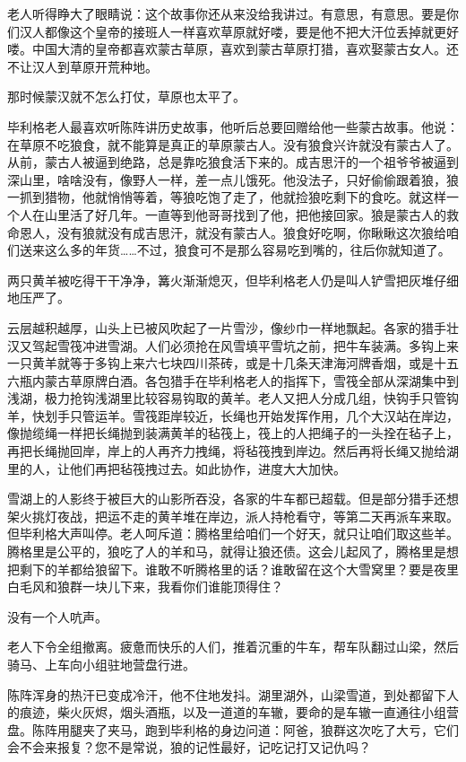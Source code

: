 \par 老人听得睁大了眼睛说：这个故事你还从来没给我讲过。有意思，有意思。要是你们汉人都像这个皇帝的接班人一样喜欢草原就好喽，要是他不把大汗位丢掉就更好喽。中国大清的皇帝都喜欢蒙古草原，喜欢到蒙古草原打猎，喜欢娶蒙古女人。还不让汉人到草原开荒种地。
\par 那时候蒙汉就不怎么打仗，草原也太平了。
\par 毕利格老人最喜欢听陈阵讲历史故事，他听后总要回赠给他一些蒙古故事。他说：在草原不吃狼食，就不能算是真正的草原蒙古人。没有狼食兴许就没有蒙古人了。从前，蒙古人被逼到绝路，总是靠吃狼食活下来的。成吉思汗的一个祖爷爷被逼到深山里，啥啥没有，像野人一样，差一点儿饿死。他没法子，只好偷偷跟着狼，狼一抓到猎物，他就悄悄等着，等狼吃饱了走了，他就捡狼吃剩下的食吃。就这样一个人在山里活了好几年。一直等到他哥哥找到了他，把他接回家。狼是蒙古人的救命恩人，没有狼就没有成吉思汗，就没有蒙古人。狼食好吃啊，你瞅瞅这次狼给咱们送来这么多的年货……不过，狼食可不是那么容易吃到嘴的，往后你就知道了。
\par 两只黄羊被吃得干干净净，篝火渐渐熄灭，但毕利格老人仍是叫人铲雪把灰堆仔细地压严了。
\par 云层越积越厚，山头上已被风吹起了一片雪沙，像纱巾一样地飘起。各家的猎手壮汉又驾起雪筏冲进雪湖。人们必须抢在风雪填平雪坑之前，把牛车装满。多钩上来一只黄羊就等于多钩上来六七块四川茶砖，或是十几条天津海河牌香烟，或是十五六瓶内蒙古草原牌白酒。各包猎手在毕利格老人的指挥下，雪筏全部从深湖集中到浅湖，极力抢钩浅湖里比较容易钩取的黄羊。老人又把人分成几组，快钩手只管钩羊，快划手只管运羊。雪筏距岸较近，长绳也开始发挥作用，几个大汉站在岸边，像抛缆绳一样把长绳抛到装满黄羊的毡筏上，筏上的人把绳子的一头拴在毡子上，再把长绳抛回岸，岸上的人再齐力拽绳，将毡筏拽到岸边。然后再将长绳又抛给湖里的人，让他们再把毡筏拽过去。如此协作，进度大大加快。
\par 雪湖上的人影终于被巨大的山影所吞没，各家的牛车都已超载。但是部分猎手还想架火挑灯夜战，把运不走的黄羊堆在岸边，派人持枪看守，等第二天再派车来取。但毕利格大声叫停。老人呵斥道：腾格里给咱们一个好天，就只让咱们取这些羊。腾格里是公平的，狼吃了人的羊和马，就得让狼还债。这会儿起风了，腾格里是想把剩下的羊都给狼留下。谁敢不听腾格里的话？谁敢留在这个大雪窝里？要是夜里白毛风和狼群一块儿下来，我看你们谁能顶得住？
\par 没有一个人吭声。
\par 老人下令全组撤离。疲惫而快乐的人们，推着沉重的牛车，帮车队翻过山梁，然后骑马、上车向小组驻地营盘行进。
\par 陈阵浑身的热汗已变成冷汗，他不住地发抖。湖里湖外，山梁雪道，到处都留下人的痕迹，柴火灰烬，烟头酒瓶，以及一道道的车辙，要命的是车辙一直通往小组营盘。陈阵用腿夹了夹马，跑到毕利格的身边问道：阿爸，狼群这次吃了大亏，它们会不会来报复？您不是常说，狼的记性最好，记吃记打又记仇吗？
